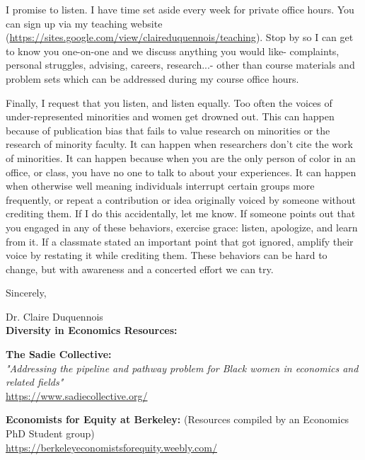 \documentclass[a4paper, 10pt]{article}
\begin{document}
I promise to listen. I have time set aside every week for private office hours. You can sign up via my teaching website (\href{https://sites.google.com/view/claireduquennois/teaching}{https://sites.google.com/view/claireduquennois/teaching}).  Stop by so I can get to know you one-on-one and we discuss anything you would like- complaints, personal struggles, advising, careers, research...- other than course materials and problem sets which can be addressed during my course office hours. 

Finally, I request that you listen, and listen equally. Too often the voices of under-represented minorities and women get drowned out. This can happen because of publication bias that fails to value research on minorities or the research of minority faculty. It can happen when researchers don't cite the work of minorities.  It can happen because when you are the only person of color in an office, or class, you have no one to talk to about your experiences. It can happen when otherwise well meaning individuals interrupt certain groups more frequently, or repeat a contribution or idea originally voiced by someone without crediting them. If I do this accidentally, let me know. If someone points out that you engaged in any of these behaviors, exercise grace: listen, apologize, and learn from it.  If a classmate stated an important point that got ignored, amplify their voice by restating it while crediting them. These behaviors can be hard to change, but with awareness and a concerted effort we can try. 
\vspace{3mm}

\noindent Sincerely, 


\noindent Dr. Claire Duquennois\\

\vspace{3mm}
\noindent \textbf{Diversity in Economics Resources: }

\noindent \textbf{The Sadie Collective:}\\
  \textit{"Addressing the pipeline and pathway problem for Black women in economics and related fields"}\\
\href{https://www.sadiecollective.org/}{https://www.sadiecollective.org/}

\noindent \textbf{Economists for Equity at Berkeley:} (Resources compiled by an Economics PhD Student group)\\
\href{https://berkeleyeconomistsforequity.weebly.com/}{https://berkeleyeconomistsforequity.weebly.com/}
\end{document}
